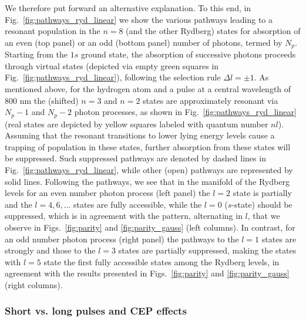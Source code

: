 We therefore put forward an alternative explanation. To this end, in Fig.\ \ref{fig:pathways_ryd_linear} we show the various pathways leading to a resonant population in the $n=8$ (and the other Rydberg) states for absorption of an even (top panel) or an odd (bottom panel) number of photons, termed by $N_p$. Starting from the $1s$ ground state, the absorption of successive photons proceeds through virtual states (depicted via empty green squares in Fig.\ \ref{fig:pathways_ryd_linear}), following the selection rule $\Delta l = \pm 1$. As mentioned above, for the hydrogen atom and a pulse at a central wavelength of 800 nm the (shifted) $n=3$ and $n=2$ states are approximately resonant via $N_p-1$ and $N_p-2$ photon processes, as shown in Fig.\ \ref{fig:pathways_ryd_linear} (real states are depicted by yellow squares labeled with quantum number $nl$). Assuming that the resonant transitions to lower lying energy levels cause a trapping of population in these states, further absorption from these states will be suppressed. Such suppressed pathways are denoted by dashed lines in Fig.\ \ref{fig:pathways_ryd_linear}, while other (open) pathways are represented by solid lines. Following the pathways, we see that in the manifold of the Rydberg levels for an even number photon process (left panel) the $l = 2$ state is partially and the $l = 4, 6, \ldots$ states are fully accessible, while the $l=0$ ($s$-state) should be suppressed, which is in agreement with the pattern, alternating in $l$, that we observe in Figs.\ \ref{fig:parity} and \ref{fig:parity_gauss} (left columns). In contrast, for an odd number photon process (right panel) the pathways to the $l=1$ states are strongly and those to the $l=3$ states are partially suppressed, making the states with $l=5$ state the first fully accessible states among the Rydberg levels, in agreement with the results presented in Figs.\ \ref{fig:parity} and \ref{fig:parity_gauss} (right columns).

\subsubsection{Short vs. long pulses and CEP effects}
\label{ssub:pulse-length}

